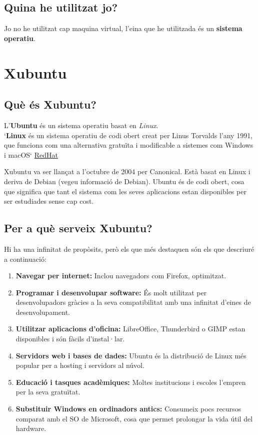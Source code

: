 \subsection{Quina he utilitzat jo?}
Jo no he utilitzat cap maquina virtual, l'eina que he utilitzada és un \textbf{sistema operatiu}.

\section{Xubuntu}
\subsection{Què és Xubuntu?}
L’\textbf{Ubuntu} és un sistema operatiu basat en \textit{Linux}.\\

`\textbf{Linux} és un sistema operatiu de codi obert creat per Linus Torvalds l’any 1991, que funciona com una alternativa gratuïta i modificable a sistemes com Windows i macOS`
\href{https://www.redhat.com/es/topics/linux}{RedHat}\\ \cite{RH}


Xubuntu va ser llançat a l’octubre de 2004 per Canonical. Està basat en Linux i deriva de Debian (vegeu informació de Debian). Ubuntu és de codi obert, cosa que significa que tant el sistema com les seves aplicacions estan disponibles per ser estudiades sense cap cost.

\subsection{Per a què serveix Xubuntu?}
Hi ha una infinitat de propòsits, però els que més destaquen són els que descriuré a continuació:
\begin{enumerate}
 \item \textbf{Navegar per internet:} Inclou navegadors com Firefox, optimitzat.
 \item \textbf{Programar i desenvolupar software:} És molt utilitzat per desenvolupadors gràcies a la seva compatibilitat amb una infinitat d’eines de desenvolupament.
 \item \textbf{Utilitzar aplicacions d’oficina:} LibreOffice, Thunderbird o GIMP estan disponibles i són fàcils d’instal·lar.
 \item \textbf{Servidors web i bases de dades:} Ubuntu és la distribució de Linux més popular per a hosting i servidors al núvol.
 \item \textbf{Educació i tasques acadèmiques:} Moltes institucions i escoles l’empren per la seva gratuïtat.
 \item \textbf{Substituir Windows en ordinadors antics:} Consumeix pocs recursos comparat amb el SO de Microsoft, cosa que permet prolongar la vida útil del hardware.
\end{enumerate}


